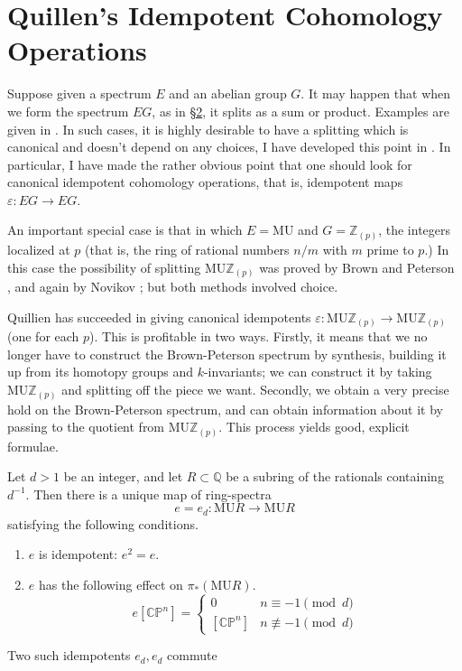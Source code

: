 \documentclass[../main]{subfiles}
\begin{document}
\label{sec:p2c15}
\chapter{Quillen's Idempotent Cohomology Operations}

Suppose given a spectrum $E$ and an abelian group $G$. It may happen that when we form the spectrum $EG$, as in \hyperref[sec:p2c2]{\S 2}, it splits as a sum or product. Examples are given in \cite[Lecture 4]{adams3}. In such cases, it is highly desirable to have a splitting which is canonical and doesn't depend on any choices, I have developed this point in \cite[Lecture 4]{adams3}. In particular, I have made the rather obvious point that one should look for canonical idempotent cohomology operations, that is, idempotent maps
$\varepsilon:EG\longrightarrow EG$.

An important special case is that in which $E = \mathrm{MU}$ and $G=\mathbb{Z}_{(p)}$, the integers localized at $p$ (that is, the ring of rational numbers $n/m$ with $m$ prime to $p$.) In this case the possibility of splitting $\mathrm{MU}\mathbb{Z}_{(p)}$ was proved by Brown and Peterson \cite{brownpeterson}, and again by Novikov \cite{novikov}; but both methods involved choice.

Quillien has succeeded in giving canonical idempotents $\varepsilon:\mathrm{MU}\mathbb{Z}_{(p)}\longrightarrow \mathrm{MU}\mathbb{Z}_{(p)}$ (one for each $p$). This is profitable in two ways. Firstly, it means that we no longer have to construct the Brown-Peterson spectrum by synthesis, building it up from its homotopy groups and $k$-invariants; we can construct it by taking $\mathrm{MU}\mathbb{Z}_{(p)}$ and splitting off the piece we want. Secondly, we obtain a very precise hold on the Brown-Peterson spectrum, and can obtain information about it by passing to the quotient from $\mathrm{MU}\mathbb{Z}_{(p)}$. This process yields good, explicit formulae.

\begin{theorem}
\label{thm:p2c15.1}
Let $d>1$ be an integer, and let $R\subset\mathbb{Q}$ be a subring of the rationals containing $d^{-1}$. Then there is a unique map of ring-spectra \[e=e_d:\mathrm{MU}R\to \mathrm{MU}R\] satisfying the following conditions.
\begin{enumerate}
    \item $e$ is idempotent: $e^2=e$.
    \item $e$ has the following effect on $\pi_\ast(\mathrm{MU}R)$. 
    \[e[\mathbb{CP}^n]=
        \begin{cases}
            0 & n\equiv-1\pmod{d}\\
            [\mathbb{CP}^n] & n\not\equiv-1\pmod{d}
        \end{cases}\]
\end{enumerate}
Two such idempotents $e_d,e_d$ commute
\end{theorem}
\end{document}
